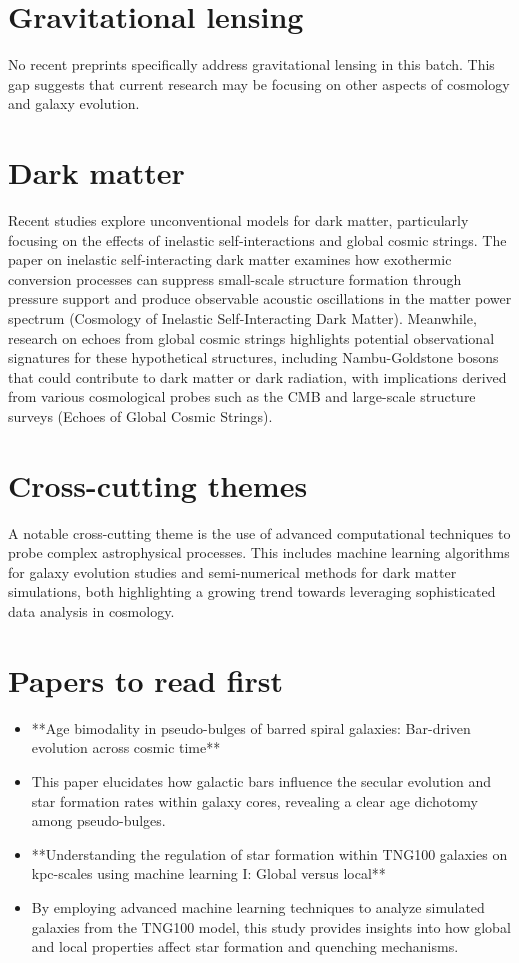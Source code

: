 \documentclass[11pt]{article}
\begin{document}
\section*{Gravitational lensing}
No recent preprints specifically address gravitational lensing in this batch. This gap suggests that current research may be focusing on other aspects of cosmology and galaxy evolution.
\section*{Dark matter}
Recent studies explore unconventional models for dark matter, particularly focusing on the effects of inelastic self-interactions and global cosmic strings. The paper on inelastic self-interacting dark matter examines how exothermic conversion processes can suppress small-scale structure formation through pressure support and produce observable acoustic oscillations in the matter power spectrum (Cosmology of Inelastic Self-Interacting Dark Matter). Meanwhile, research on echoes from global cosmic strings highlights potential observational signatures for these hypothetical structures, including Nambu-Goldstone bosons that could contribute to dark matter or dark radiation, with implications derived from various cosmological probes such as the CMB and large-scale structure surveys (Echoes of Global Cosmic Strings).
\section*{Cross-cutting themes}
A notable cross-cutting theme is the use of advanced computational techniques to probe complex astrophysical processes. This includes machine learning algorithms for galaxy evolution studies and semi-numerical methods for dark matter simulations, both highlighting a growing trend towards leveraging sophisticated data analysis in cosmology.
\section*{Papers to read first}
\begin{itemize}
\item **Age bimodality in pseudo-bulges of barred spiral galaxies: Bar-driven evolution across cosmic time**
\item This paper elucidates how galactic bars influence the secular evolution and star formation rates within galaxy cores, revealing a clear age dichotomy among pseudo-bulges.
\end{itemize}
\begin{itemize}
\item **Understanding the regulation of star formation within TNG100 galaxies on kpc-scales using machine learning I: Global versus local**
\item By employing advanced machine learning techniques to analyze simulated galaxies from the TNG100 model, this study provides insights into how global and local properties affect star formation and quenching mechanisms.
\end{itemize}
\end{document}
